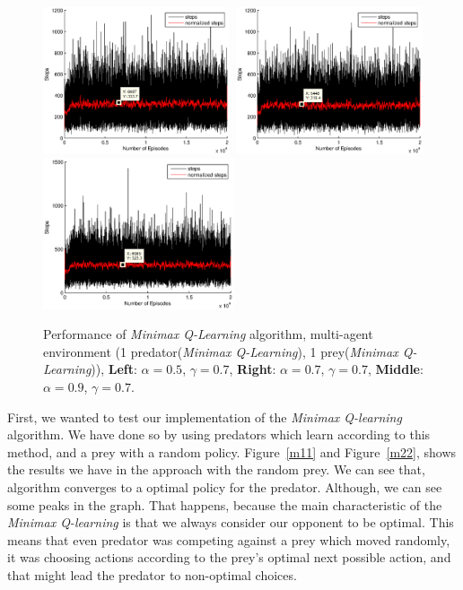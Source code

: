 \documentclass[a4paper,11pt]{article}
\begin{document}
\begin{figure}[h]
\begin{center}
    \includegraphics[width=0.49\textwidth]{figures/mm05.eps}\	
    \includegraphics[width=0.49\textwidth]{figures/mm07.eps}\\
    \includegraphics[width=0.5\textwidth]{figures/mm09.eps}
    \caption{Performance of  \textit{Minimax Q-Learning} algorithm, multi-agent environment (1 predator(\textit{Minimax Q-Learning}), 1 prey(\textit{Minimax Q-Learning})), \textbf{Left}: $\alpha = 0.5$, $\gamma = 0.7$, \textbf{Right}: $\alpha = 0.7$, $\gamma = 0.7$, \textbf{Middle}: $\alpha = 0.9$, $\gamma = 0.7$.}
    \label{m13}
\end{center}
\end{figure}

First, we wanted to test our implementation of the \textit{Minimax Q-learning} algorithm. We have done so by using predators which learn according to this method, and a prey with a random policy. Figure~\ref{m11} and Figure~\ref{m22}, shows the results we have in the approach with the random prey. We can see that, algorithm converges to a optimal policy for the predator. Although, we can see some peaks in the graph. That happens, because the main characteristic of the \textit{Minimax Q-learning} is that we always consider our opponent to be optimal. This means that even predator was competing against a prey which moved randomly, it was choosing actions according to the prey's optimal next possible action, and that might lead the predator to non-optimal choices.
\end{document}
